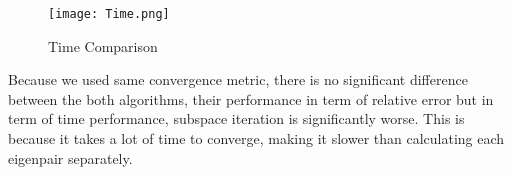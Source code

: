 \documentclass[10pt,a4paper, margin=1in]{article}
\begin{document}
\begin{enumerate}
\begin{enumerate}
		\begin{figure}[h]
  			\centering
  			\texttt{[image: Time.png]}
  			\caption{Time Comparison}
  			\label{Time}
		\end{figure}
     	\end{enumerate}
    	
		Because we used same convergence metric, there is no significant difference between the both algorithms, their performance in term of relative error but in term of time performance, subspace iteration is significantly worse. This is because it takes a lot of time to converge, making it slower than calculating each eigenpair separately.
\end{enumerate}
\end{document}
